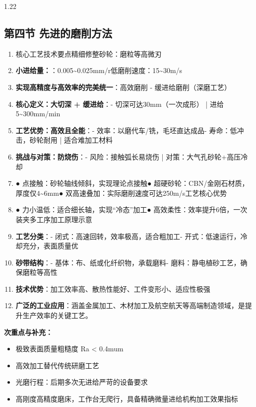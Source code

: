 \documentclass[12pt,a4paper]{article}
\begin{document}
\begin{spacing}{1.22}
\subsection{第四节 先进的磨削方法}
\begin{tcolorbox}[colback=yellow!6,colframe=red!55!black,title=重点,left=1mm,right=1mm]
\begin{enumerate}[leftmargin=2.2em,label=\arabic*.]
  \item 核心工艺技术要点精细修整砂轮：磨粒等高微刃
  \item \textbf{小进给量：}：0.005\textasciitilde{}0.025mm/r低磨削速度：15\textasciitilde{}30m/s
  \item \textbf{实现高精度与高效率的完美统一}：高效磨削 - 缓进给磨削（深磨工艺）
  \item \textbf{核心定义：大切深 + 缓进给}：- 切深可达30mm（一次成形） | 进给5\textasciitilde{}300mm/min
  \item \textbf{工艺优势：高效且全能}：- 效率：以磨代车/铣，毛坯直达成品- 寿命：低冲击，砂轮耐用 | 适合难加工材料
  \item \textbf{挑战与对策：防烧伤}：- 风险：接触弧长易烧伤 | 对策：大气孔砂轮+高压冷却
  \item ● 点接触：砂轮轴线倾斜，实现理论点接触● 超硬砂轮：CBN/金刚石材质，厚度仅4\textasciitilde{}6mm● 双高速叠加：实际磨削速度可达250m/s工艺核心优势
  \item ● 力小温低：适合细长轴，实现“冷态”加工● 高效柔性：效率提升6倍，一次装夹多工序加工原理示意
  \item \textbf{工艺分类}：- 闭式：高速回转，效率极高，适合粗加工- 开式：低速运行，冷却充分，表面质量优
  \item \textbf{砂带结构}：- 基体：布、纸或化纤织物，承载磨料- 磨料：静电植砂工艺，确保磨粒等高性
  \item \textbf{技术优势}：加工效率高、散热性能好、工件变形小、适应性极强
  \item \textbf{广泛的工业应用}：涵盖金属加工、木材加工及航空航天等高端制造领域，是提升生产效率的关键工艺。
\end{enumerate}
\end{tcolorbox}
\noindent\textbf{次重点与补充：}
\begin{itemize}[leftmargin=2.2em,label=--]
  \item 极致表面质量粗糙度 Ra < 0.4mum
  \item 高效加工替代传统研磨工艺
  \item 光磨行程：后期多次无进给严苛的设备要求
  \item 高刚度高精度磨床，工作台无爬行，具备精确微量进给机构加工效果指标

\end{itemize}
\end{spacing}
\end{document}
